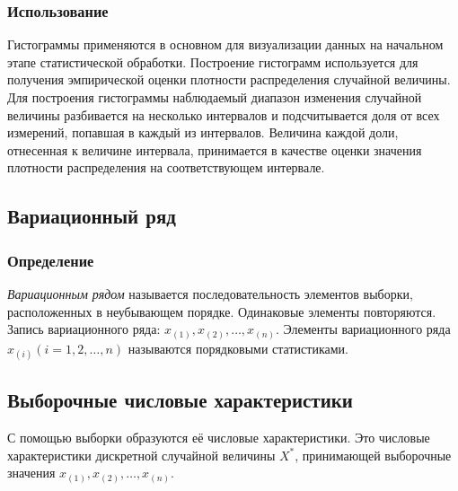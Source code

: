 \documentclass[a4paper]{article}
\begin{document}
\subsubsection{Использование}
\noindent Гистограммы применяются в основном для визуализации данных на начальном этапе статистической обработки. \newline Построение гистограмм используется для получения эмпирической оценки плотности распределения случайной величины. Для построения гистограммы наблюдаемый диапазон изменения случайной величины разбивается на несколько интервалов и подсчитывается доля от всех измерений, попавшая в каждый из интервалов. Величина каждой доли, отнесенная к величине интервала, принимается в качестве оценки значения плотности распределения на соответствующем интервале.
	
\subsection{Вариационный ряд}
\subsubsection{Определение}
\noindent \textit{Вариационным рядом} называется последовательность элементов выборки, расположенных в неубывающем порядке. Одинаковые элементы повторяются.
Запись вариационного ряда: $x_{(1)}, x_{(2)}, \ldots, x_{(n)}$.
Элементы вариационного ряда $x_{(i)} (i = 1, 2, \ldots, n)$ называются порядковыми статистиками.

\subsection{Выборочные числовые характеристики}
\noindent С помощью выборки образуются её числовые характеристики. Это числовые характеристики дискретной случайной величины $X^{*}$, принимающей выборочные значения $x_{(1)}, x_{(2)}, \ldots, x_{(n)}$.
\end{document}
